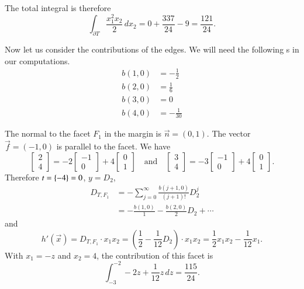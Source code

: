 \begin{example}
The total integral is therefore
$$
\int_{\partial T} \frac{x_1^2 x_2}2 \, d x_2
= 0 + \frac{337}{24} - 9 = \frac{121}{24}
.
$$

Now let us consider the contributions of the edges.
We will need the following s in our
computations.
\begin{align*}
b(1,0) & = - \frac 1 2
\\
b(2,0) & = \frac 1 6
\\
b(3,0) & = 0
\\
b(4,0) & = -\frac 1 {30}
\end{align*}

%
The normal to the facet $F_1$ in the margin is $\vec n = (0,1)$.
The vector $\vec f = (-1,0)$ is parallel to the facet.
We have
$$
\begin{bmatrix}
2 \\ 4
\end{bmatrix}
=
-2
\begin{bmatrix}
-1 \\ 0
\end{bmatrix}
+4
\begin{bmatrix}
0 \\ 1
\end{bmatrix}
\quad\text{and}\quad
\begin{bmatrix}
3 \\ 4
\end{bmatrix}
=
-3
\begin{bmatrix}
-1 \\ 0
\end{bmatrix}
+4
\begin{bmatrix}
0 \\ 1
\end{bmatrix}
.
$$
Therefore $t = \left\{-4\right\} = 0$, $y = D_2$,
\begin{align*}
D_{T,F_1}
& = 
- \sum_{j=0}^\infty \frac{b(j+1, 0)}{(j+1)!} D_2^j
\\
& =
- \frac{b(1,0)}1 - \frac{b(2,0)}2 D_2 + \cdots
\end{align*}
and
$$
h'(\vec x) =
D_{T,F_1} \cdot x_1 x_2 =
\left(\frac 1 2 - \frac 1{12} D_2\right) \cdot x_1 x_2
=
\frac 1 2 x_1 x_2 - \frac 1{12} x_1
.
$$
With $x_1 = - z$ and $x_2 = 4$, the contribution of this facet
is
$$
\int_{-3}^{-2} - 2 z + \frac 1{12} z \, dz
=
\frac{115}{24}
.
$$


\end{example}
